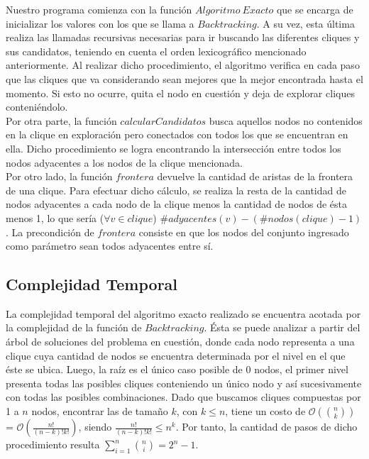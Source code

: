 Nuestro programa comienza con la función $Algoritmo\ Exacto$ que se encarga de inicializar los valores con los que se llama a $Backtracking$. A su vez, esta última realiza las llamadas recursivas necesarias para ir buscando las diferentes cliques y sus candidatos, teniendo en cuenta el orden lexicográfico mencionado anteriormente. Al realizar dicho procedimiento, el algoritmo verifica en cada paso que las cliques que va considerando sean mejores que la mejor encontrada hasta el momento. Si esto no ocurre, quita el nodo en cuestión y deja de explorar cliques conteniéndolo.\\
\newline
Por otra parte, la función $calcularCandidatos$ busca aquellos nodos no contenidos en la clique en exploración pero conectados con todos los que se encuentran en ella. Dicho procedimiento se logra encontrando la intersección entre todos los nodos adyacentes a los nodos de la clique mencionada.\\
\newline
Por otro lado, la función $frontera$ devuelve la cantidad de aristas de la frontera de una clique. Para efectuar dicho cálculo, se realiza la resta de la cantidad de nodos adyacentes a cada nodo de la clique menos la cantidad de nodos de ésta menos 1, lo que sería ($\forall v \in clique$) $\#adyacentes(v)-(\#nodos(clique)-1)$. La precondición de $frontera$ consiste en que los nodos del conjunto ingresado como parámetro sean todos adyacentes entre sí.

\subsection{Complejidad Temporal}

La complejidad temporal del algoritmo exacto realizado se encuentra acotada por la complejidad de la función de $Backtracking$. Ésta se puede analizar a partir del árbol de soluciones del problema en cuestión, donde cada nodo representa a una clique cuya cantidad de nodos se encuentra determinada por el nivel en el que éste se ubica. Luego, la raíz es el único caso posible de 0 nodos, el primer nivel presenta todas las posibles cliques conteniendo un único nodo y así sucesivamente con todas las posibles combinaciones. Dado que buscamos cliques compuestas por 1 a $n$ nodos, encontrar las de tamaño $k$, con $k\leq n$, tiene un costo de $\mathcal{O}({n \choose k})$ = $\mathcal{O}(\frac{n!}{(n-k)!k!})$, siendo $\frac{n!}{(n-k)!k!} \leq n^k$. Por tanto, la cantidad de pasos de dicho procedimiento resulta $\sum\limits_{i=1}^n {n \choose i} = 2^n - 1$. 

